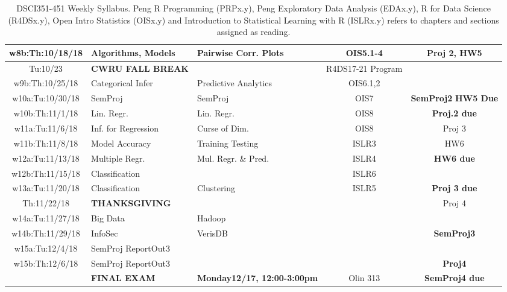 \documentclass[11pt]{article} %
\begin{document}
\begin{table}[h]
\begin{tabular}{| c | p{3.4cm} | p{3.4cm} | c | c |}
	\hline
	w8b:Th:10/18/18 & Algorithms, Models & Pairwise Corr. Plots  & OIS5.1-4 & Proj 2, HW5 \\
	\hline
	\hline 
	Tu:10/23 & {\bf CWRU FALL BREAK} &  & R4DS17-21 Program \\ 
	\hline
	w9b:Th:10/25/18 & Categorical Infer  & Predictive Analytics & OIS6.1,2 & \\ 
	\hline 
	\hline
	w10a:Tu:10/30/18 & SemProj & SemProj & OIS7   &  {\bf SemProj2}  {\bf HW5 Due}  \\
	\hline
	w10b:Th:11/1/18 & Lin. Regr. & Lin. Regr. &  OIS8 &  {\bf Proj.2 due} \\	
	\hline
	\hline
	w11a:Tu:11/6/18 & Inf. for Regression  & Curse of Dim. & OIS8 & Proj 3  \\
	\hline 
	w11b:Th:11/8/18 & Model Accuracy & Training Testing & ISLR3 & HW6  \\ 
	\hline
	\hline
	w12a:Tu:11/13/18 & Multiple Regr. & Mul. Regr. \& Pred. & ISLR4 & {\bf HW6 due}  \\
	\hline 
	w12b:Th:11/15/18 & Classification &  & ISLR6  &   \\ 
	\hline
	\hline
	w13a:Tu:11/20/18 & Classification & Clustering & ISLR5 & {\bf } {\bf Proj 3 due} \\
	\hline 
	Th:11/22/18 & {\bf THANKSGIVING} &  &   &  Proj 4 \\ 
	\hline
	\hline 
	w14a:Tu:11/27/18 & Big Data & Hadoop & &  \\ 
	\hline
	w14b:Th:11/29/18 & InfoSec & VerisDB &  & {\bf SemProj3} \\
	\hline
	w15a:Tu:12/4/18 & SemProj ReportOut3  &  & {\bf } \\ 
	\hline
	w15b:Th:12/6/18 & SemProj ReportOut3 &  & & {\bf Proj4} \\
	\hline
	\hline
	\hline
		  & {\bf FINAL EXAM} & {\bf Monday12/17, 12:00-3:00pm}  & Olin 313 & {\bf SemProj4 due} \\
	\hline
	\hline
\end{tabular}
 
\caption{DSCI351-451 Weekly Syllabus. Peng R Programming (PRPx.y), Peng Exploratory Data Analysis (EDAx.y), R for Data Science (R4DSx.y), Open Intro Statistics (OISx.y) and Introduction to Statistical Learning with R (ISLRx.y) refers to chapters and sections assigned as reading. }
\label{table:Syllabus} %
\end{table} 

\FloatBarrier

\end{document}
